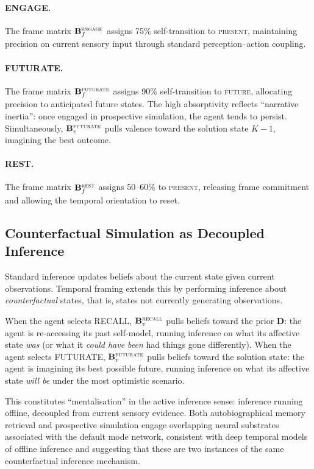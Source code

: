 \documentclass[11pt,a4paper]{article}
\begin{document}
\paragraph{ENGAGE.} The frame matrix $\mathbf{B}_f^{\textsc{engage}}$ assigns 75\% self-transition to \textsc{present}, maintaining precision on current sensory input through standard perception--action coupling.

\paragraph{FUTURATE.} The frame matrix $\mathbf{B}_f^{\textsc{futurate}}$ assigns 90\% self-transition to \textsc{future}, allocating precision to anticipated future states. The high absorptivity reflects ``narrative inertia'': once engaged in prospective simulation, the agent tends to persist. Simultaneously, $\mathbf{B}_v^{\textsc{futurate}}$ pulls valence toward the solution state $K{-}1$, imagining the best outcome.

\paragraph{REST.} The frame matrix $\mathbf{B}_f^{\textsc{rest}}$ assigns 50--60\% to \textsc{present}, releasing frame commitment and allowing the temporal orientation to reset.

\subsection{Counterfactual Simulation as Decoupled Inference}\label{sec:decoupled}

Standard inference updates beliefs about the current state given current observations. Temporal framing extends this by performing inference about \emph{counterfactual} states, that is, states not currently generating observations.

When the agent selects RECALL, $\mathbf{B}_v^{\textsc{recall}}$ pulls beliefs toward the prior $\mathbf{D}$: the agent is re-accessing its past self-model, running inference on what its affective state \emph{was} (or what it \emph{could have been} had things gone differently). When the agent selects FUTURATE, $\mathbf{B}_v^{\textsc{futurate}}$ pulls beliefs toward the solution state: the agent is imagining its best possible future, running inference on what its affective state \emph{will be} under the most optimistic scenario.

This constitutes ``mentalisation'' in the active inference sense: inference running offline, decoupled from current sensory evidence. Both autobiographical memory retrieval and prospective simulation engage overlapping neural substrates associated with the default mode network, consistent with deep temporal models of offline inference \citep{friston2018deep} and suggesting that these are two instances of the same counterfactual inference mechanism.
\end{document}
